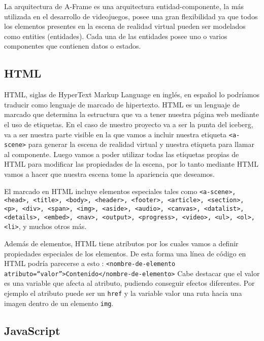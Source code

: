 \documentclass[a4paper, 12pt]{book}
\begin{document}
 La arquitectura de A-Frame es una arquitectura entidad-componente, la más utilizada en el desarrollo de videojuegos, posee una gran flexibilidad ya que todos los elementos presentes en la escena de realidad virtual pueden ser modelados como entities (entidades). Cada una de las entidades posee uno o varios componentes que contienen datos o estados.
 
  
\subsection{ HTML} 
\label{sec:html}

HTML, siglas de HyperText Markup Language en inglés, en español lo podríamos traducir como lenguaje de marcado de hipertexto. HTML es un lenguaje de marcado que determina la estructura que va a tener nuestra página web mediante el uso de etiquetas. En el caso de nuestro proyecto va a ser la punta del iceberg, va a ser nuestra parte visible en la que vamos a incluir nuestra etiqueta \texttt{<a-scene>} para generar la escena de realidad virtual y nuestra etiqueta para llamar al componente. Luego vamos a poder utilizar todas las etiquetas propias de HTML para modificar las propiedades de la escena, por lo tanto mediante HTML vamos a hacer que nuestra escena tome la apariencia que deseamos.


El marcado en HTML incluye elementos especiales tales como \texttt{<a-scene>, <head>, <title>, <body>, <header>, <footer>, <article>, <section>, <p>, <div>, <span>, <img>, <aside>, <audio>, <canvas>, <datalist>, <details>, <embed>, <nav>, <output>, <progress>, <video>, <ul>, <ol>, <li>}, y muchos otros más.

 Además de elementos, HTML tiene atributos por los cuales vamos a definir propiedades especiales de los elementos. De esta forma una línea de código en HTML podría parecerse a esto : \newline  \texttt{<nombre-de-elemento atributo=``valor''>Contenido</nombre-de-elemento>} \newline Cabe destacar que el valor es una variable que afecta al atributo, pudiendo conseguir efectos diferentes. Por ejemplo el atributo puede ser un \texttt{href} y la variable valor una ruta hacia una imagen dentro de un elemento \texttt{img}.


\subsection{ JavaScript} 
\label{sec:javascript}
\end{document}
